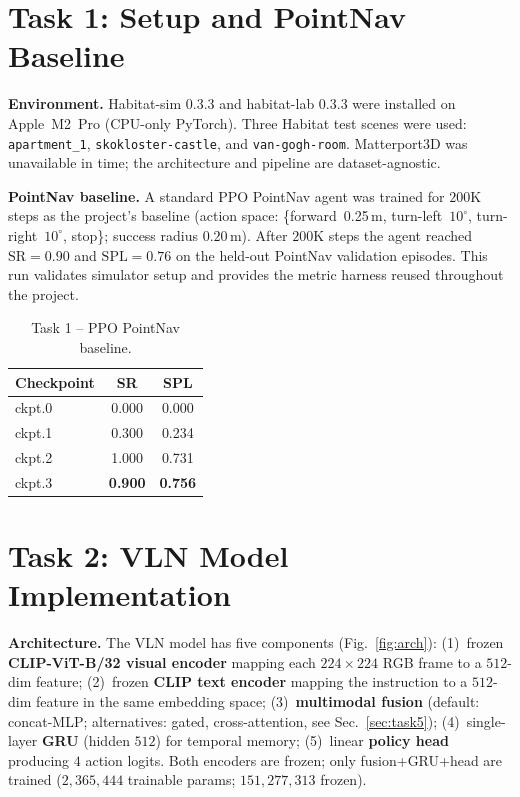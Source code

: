 \documentclass[10pt, twocolumn]{article}
\begin{document}
\section{Task 1: Setup and PointNav Baseline}\label{sec:task1}

\textbf{Environment.} Habitat-sim 0.3.3 and habitat-lab 0.3.3 were installed
on Apple~M2~Pro (CPU-only PyTorch). Three Habitat test scenes were used:
\texttt{apartment\_1}, \texttt{skokloster-castle}, and
\texttt{van-gogh-room}. Matterport3D was unavailable in time; the
architecture and pipeline are dataset-agnostic.

\textbf{PointNav baseline.} A standard PPO PointNav agent was trained for
$200$K steps as the project's baseline (action space:
\{forward~0.25\,m, turn-left~$10^{\circ}$, turn-right~$10^{\circ}$,
stop\}; success radius $0.20$\,m). After $200$K steps the agent reached
$\mathrm{SR}\!=\!0.90$ and $\mathrm{SPL}\!=\!0.76$ on the held-out
PointNav validation episodes. This run validates simulator setup and
provides the metric harness reused throughout the project.

\begin{table}[ht]\centering\small
\caption{Task 1 -- PPO PointNav baseline.}
\begin{tabular}{lcc}\toprule
Checkpoint & SR & SPL \\\midrule
ckpt.0  & 0.000 & 0.000 \\
ckpt.1  & 0.300 & 0.234 \\
ckpt.2  & 1.000 & 0.731 \\
ckpt.3  & \textbf{0.900} & \textbf{0.756} \\\bottomrule
\end{tabular}
\label{tab:task1}
\end{table}

\section{Task 2: VLN Model Implementation}\label{sec:task2}

\textbf{Architecture.} The VLN model has five components
(Fig.~\ref{fig:arch}):
(1)~frozen \textbf{CLIP-ViT-B/32 visual encoder} mapping each $224\!\times\!224$
RGB frame to a $512$-dim feature;
(2)~frozen \textbf{CLIP text encoder} mapping the instruction to a $512$-dim
feature in the same embedding space;
(3)~\textbf{multimodal fusion} (default: concat-MLP; alternatives: gated,
cross-attention, see Sec.~\ref{sec:task5});
(4)~single-layer \textbf{GRU} (hidden $512$) for temporal memory;
(5)~linear \textbf{policy head} producing $4$ action logits.
Both encoders are frozen; only fusion+GRU+head are trained
($2{,}365{,}444$ trainable params; $151{,}277{,}313$ frozen).
\end{document}
